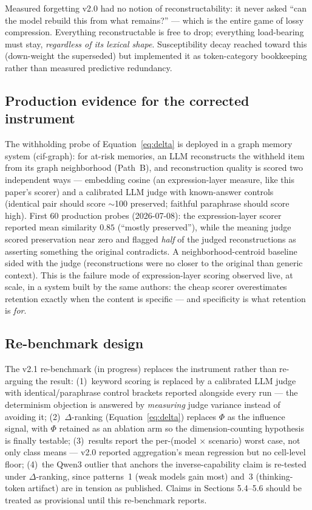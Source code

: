 \documentclass[11pt,a4paper]{article}
\begin{document}
Measured forgetting v2.0 had no notion of reconstructability: it never asked ``can the model rebuild this from what remains?'' --- which is the entire game of lossy compression. Everything reconstructable is free to drop; everything load-bearing must stay, \emph{regardless of its lexical shape}. Susceptibility decay reached toward this (down-weight the superseded) but implemented it as token-category bookkeeping rather than measured predictive redundancy.

\subsection{Production evidence for the corrected instrument}

The withholding probe of Equation~\ref{eq:delta} is deployed in a graph memory system (cif-graph): for at-risk memories, an LLM reconstructs the withheld item from its graph neighborhood (Path~B), and reconstruction quality is scored two independent ways --- embedding cosine (an expression-layer measure, like this paper's scorer) and a calibrated LLM judge with known-answer controls (identical pair should score $\sim$100 preserved; faithful paraphrase should score high). First 60 production probes (2026-07-08): the expression-layer scorer reported mean similarity $0.85$ (``mostly preserved''), while the meaning judge scored preservation near zero and flagged \emph{half} of the judged reconstructions as asserting something the original contradicts. A neighborhood-centroid baseline sided with the judge (reconstructions were no closer to the original than generic context). This is the failure mode of expression-layer scoring observed live, at scale, in a system built by the same authors: the cheap scorer overestimates retention exactly when the content is specific --- and specificity is what retention is \emph{for}.

\subsection{Re-benchmark design}

The v2.1 re-benchmark (in progress) replaces the instrument rather than re-arguing the result: (1)~keyword scoring is replaced by a calibrated LLM judge with identical/paraphrase control brackets reported alongside every run --- the determinism objection is answered by \emph{measuring} judge variance instead of avoiding it; (2)~$\Delta$-ranking (Equation~\ref{eq:delta}) replaces $\Phi$ as the influence signal, with $\Phi$ retained as an ablation arm so the dimension-counting hypothesis is finally testable; (3)~results report the per-(model $\times$ scenario) worst case, not only class means --- v2.0 reported aggregation's mean regression but no cell-level floor; (4)~the Qwen3 outlier that anchors the inverse-capability claim is re-tested under $\Delta$-ranking, since patterns~1 (weak models gain most) and~3 (thinking-token artifact) are in tension as published. Claims in Sections 5.4--5.6 should be treated as provisional until this re-benchmark reports.
\end{document}
